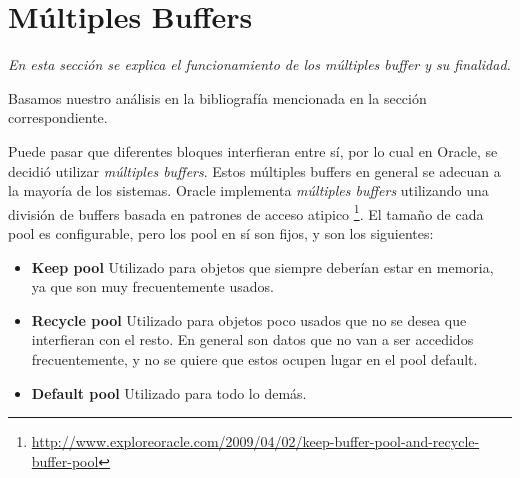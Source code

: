 \section{Múltiples Buffers}

\textsl{En esta secci\'on se explica el funcionamiento de los
múltiples buffer y su finalidad.}

\vspace*{0.5cm}

Basamos nuestro análisis en la bibliografía mencionada en la 
sección correspondiente.

\vspace*{0.5cm}

Puede pasar que diferentes bloques interfieran entre sí, por lo cual 
en Oracle, se decidió utilizar \textit{m\'ultiples buffers}. 
Estos múltiples buffers en general se adecuan a la mayoría de los sistemas.
Oracle implementa \textit{m\'ultiples buffers} utilizando una división de 
buffers basada en patrones de acceso atipico 
\footnote{\href{http://www.exploreoracle.com/2009/04/02/keep-buffer-pool-and-recycle-buffer-pool}{http://www.exploreoracle.com/2009/04/02/keep-buffer-pool-and-recycle-buffer-pool}}.
El tamaño de cada pool es configurable, pero los pool en sí son fijos, y
son los siguientes:

\begin{itemize}
  \item \textbf{Keep pool}
    Utilizado para objetos que siempre deber\'ian estar en memoria, 
    ya que son muy frecuentemente usados.

  \item \textbf{Recycle pool}
    Utilizado para objetos poco usados que no se desea que interfieran 
    con el resto. En general son datos que no van a ser accedidos 
    frecuentemente, y no se quiere que estos ocupen lugar en el pool default.

  \item \textbf{Default pool} 
    Utilizado para todo lo dem\'as.
\end{itemize}